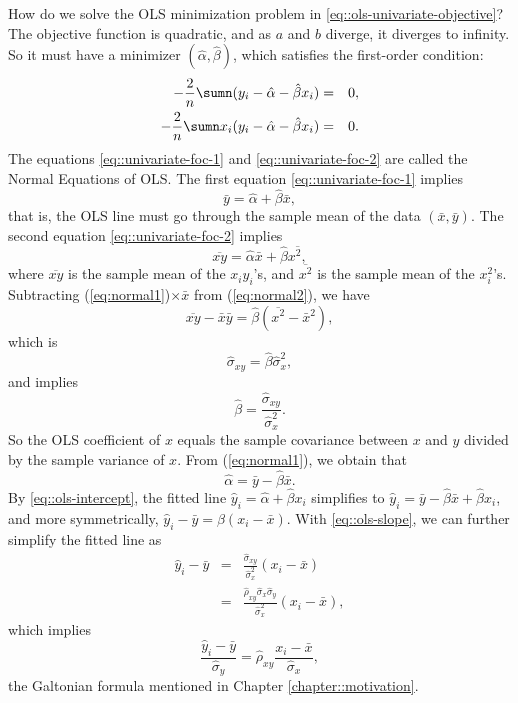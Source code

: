 How do we solve the OLS minimization problem in \eqref{eq::ols-univariate-objective}? The objective function
is quadratic, and as $a$ and $b$ diverge, it diverges to
infinity. So it must have a minimizer $(\hat{\alpha},\hat{\beta})$, which satisfies the first-order condition:
\begin{eqnarray}
-\frac{2}{n}\sumn(y_{i}-\hat{\alpha}-\hat{\beta}x_{i}) & = &0,\label{eq::univariate-foc-1} \\
-\frac{2}{n}\sumn x_{i}(y_{i}-\hat{\alpha}-\hat{\beta}x_{i}) & =&0.\label{eq::univariate-foc-2}
\end{eqnarray}
The equations \eqref{eq::univariate-foc-1} and \eqref{eq::univariate-foc-2} are called the Normal Equations of OLS. The first
equation \eqref{eq::univariate-foc-1} implies 
\begin{equation}
\bar{y}=\hat{\alpha}+\hat{\beta}\bar{x},\label{eq:normal1}
\end{equation}
that is, the OLS line must go through the sample mean of the data $(\bar{x},\bar{y}).$ The second equation \eqref{eq::univariate-foc-2} implies
\begin{equation}
\overline{xy}=\hat{\alpha}\bar{x}+\hat{\beta}\overline{x^{2},}\label{eq:normal2}
\end{equation}
where $\overline{xy}$ is the sample mean of the $x_{i}y_{i}$'s, and $\overline{x^{2}}$
is the sample mean of the $x_{i}^{2}$'s. Subtracting (\ref{eq:normal1})$\times\bar{x}$
from (\ref{eq:normal2}), we have
$$
\overline{xy} - \bar{x} \bar{y} = \hat{\beta} ( \overline{x^{2}} - \bar{x}^2 ) ,
$$
which is
$$
\hat{\sigma}_{xy} =\hat{\beta} \hat{\sigma}_{x}^2 ,
$$
and implies
\begin{equation}
\label{eq::ols-slope}
\hat{\beta} =   \frac{\hat{\sigma}_{xy}}{\hat{\sigma}_{x}^2}. 
\end{equation}
So the OLS coefficient of $x$ equals the sample covariance between
$x$ and $y$ divided by the sample variance of $x$. From (\ref{eq:normal1}),
we obtain that 
\begin{equation}
\label{eq::ols-intercept}
\hat{\alpha}=\bar{y}-\hat{\beta}\bar{x}.
\end{equation}
By \eqref{eq::ols-intercept}, the fitted line $\hat{y}_i  =\hat{\alpha}+\hat{\beta}x_i$ simplifies to $\hat{y}_i  = \bar{y}-\hat{\beta}\bar{x}+\hat{\beta}x_i$, and more symmetrically, $\hat{y}_i -\bar{y}=\hat{\beta}(x_i-\bar{x})$. With \eqref{eq::ols-slope}, we can further simplify the fitted line as
\begin{eqnarray*}
\hat{y}_i -\bar{y} &=& \frac{   \hat{\sigma}_{xy}  }{  \hat{\sigma}_{x}^2  }(x_i-\bar{x}) \\
 &=&\frac{  \hat{\rho}_{xy} \hat{\sigma}_{x}\hat{\sigma}_{y}}{\hat{\sigma}_{x}^{2}}(x_i-\bar{x}),
\end{eqnarray*}
which implies
$$
\frac{\hat{y}_i -\bar{y}}{\hat{\sigma}_{y}}= \hat{\rho}_{xy}  \frac{x_i-\bar{x}}{\hat{\sigma}_{x}},
$$
the Galtonian formula mentioned in Chapter \ref{chapter::motivation}. 




